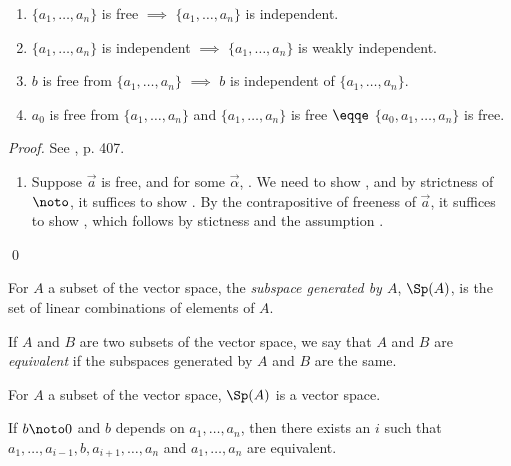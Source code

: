 {\begin{lemma}
\begin{enumerate}
\item $\{ a_1, \ldots, a_n\}$ is  free $\implies$ $\{ a_1, \ldots,
a_n\}$ is independent.
\item $\{ a_1, \ldots, a_n\}$ is independent $\implies$ $\{ a_1, \ldots,
a_n\}$ is weakly independent.
\item $b$ is free from $\{ a_1, \ldots, a_n\}$ $\implies$ $b$ is
independent of $\{ a_1, \ldots, a_n\}$.
\item $a_0$ is free from $\{ a_1, \ldots, a_n\}$  and $\{ a_1, \ldots,
a_n\}$ is  free $\eqqe$ $\{ a_0, a_1, \ldots, a_n\}$ is  free.
\end{enumerate}
\end{lemma}
\begin{proof}
See \cite{TvD882}, p. 407.
\begin{enumerate}
\item Suppose $\vec{a}$ is free, and for some $\vec{\alpha}$,
.  We need to show 
,
and by strictness of $\noto$, it suffices to show
.  By the contrapositive of freeness of 
$\vec{a}$, it suffices to show
, which follows by stictness
and the assumption .
\end{enumerate} \qed
\end{proof}

\begin{definition}\label{defsubspace} For $A$ a subset of the vector
space, the {\em subspace generated by $A$}, $\Sp(A)$, is the set of
linear combinations of elements of $A$.

If $A$ and $B$ are two subsets of the vector
space, we say that $A$ and $B$ are {\em equivalent\/} if the subspaces
generated by $A$ and $B$ are the same.
\end{definition}

\begin{lemma} For $A$ a subset of the vector
space, $\Sp(A)$ is a vector space.
\end{lemma}

\begin{lemma}
If $b\noto 0$ and $b$ depends on $a_1, \ldots, a_n$, then there exists
an $i$ such that\\ 
$a_1, \ldots, a_{i-1}, b, a_{i+1}, \ldots, a_n$ and
$a_1, \ldots, a_n$ are equivalent.
\end{lemma}

}
